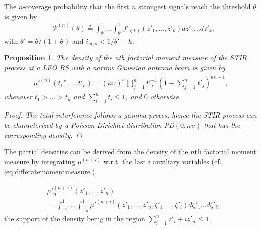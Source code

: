 \documentclass[lettersize,journal]{IEEEtran}
\newtheorem{prop}[theorem]{Proposition}
\begin{document}
The $n$-coverage probability that the first $n$ strongest signals reach the threshold $\theta$ is given by
\begin{align}
  \label{eq:kprobability}
  &\mathcal{P}^{(n)}(\theta) \triangleq  \int_{\theta'}^1\dots \int_{\theta'}^1 f'_{(k)}({z'_1},\dots,{z'_k})dz'_1 \dots d{z'_k}, 
\end{align}
with $\theta'=\theta/(1+\theta)$ and $i_{\text{max}}<1/\theta'-k$.


\label{sec:partialdensitySIR}


\begin{prop}
  The density of the n\textit{th} factorial moment measure of the STIR process at a LEO BS with a narrow Gaussian antenna beam is given by
  \begin{align}
    \label{eq:factorialmoment}
    \mu'^{(n)}(t_1',\dots,t'_n) = (\tilde{\kappa}\upsilon_{})^n\prod_{j=1}^n{t'}_{j}^{-1}\left(1- \sum_{j=1}^nt'_j \right)^{\tilde{\kappa}\upsilon_{}-1},       
  \end{align}
  whenever $t_1>\dots >t_n$ and $\sum_{i=1}^n t_i \leq 1$, and $0$ otherwise.
  \begin{proof}
    The total interference follows a gamma proces, hence the STIR process can be characterized by a Poisson-Dirichlet distribution PD$(0,\tilde{\kappa}\upsilon)$ that has the corresponding density.
  \end{proof}
\end{prop}

The partial densities can be derived from the density of the $n$th factorial moment measure by integrating $\mu^{(n+i)}$ w.r.t. the last $i$ auxiliary variables (cf. \eqref{eq:differatemomentmeasure}).

\begin{align}
  \label{eq:auxillary}
  &{\mu'}_n^{(n+i)}(z'_1,\dots,z'_n) \nonumber \\
  &= \int_{z'_n}^1 \dots \int_{z'_n}^1 {\mu'}^{(n+i)}(z'_1,\dots,z'_n,\zeta'_1,\dots,\zeta'_i) d\zeta'_1 \dots d\zeta'_i,
\end{align}
the support of the density being in the region $\sum_{i=1}^nz'_i+iz'_n \leq 1$. 
\end{document}
